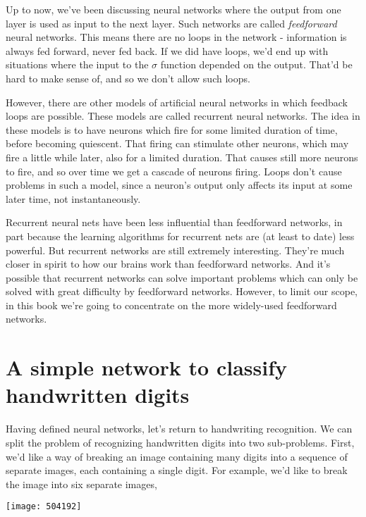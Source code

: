 Up to now, we've been discussing neural networks where the output from one layer is used as input to the next layer. Such networks are called \textit{feedforward} neural networks. This means there are no loops in the network - information is always fed forward, never fed back. If we did have loops, we'd end up with situations where the input to the $\sigma$ function depended on the output. That'd be hard to make sense of, and so we don't allow such loops.

However, there are other models of artificial neural networks in which feedback loops are possible. These models are called recurrent neural networks\cite{WikiPediaRNN2019}. The idea in these models is to have neurons which fire for some limited duration of time, before becoming quiescent. That firing can stimulate other neurons, which may fire a little while later, also for a limited duration. That causes still more neurons to fire, and so over time we get a cascade of neurons firing. Loops don't cause problems in such a model, since a neuron's output only affects its input at some later time, not instantaneously.

Recurrent neural nets have been less influential than feedforward networks, in part because the learning algorithms for recurrent nets are (at least to date) less powerful. But recurrent networks are still extremely interesting. They're much closer in spirit to how our brains work than feedforward networks. And it's possible that recurrent networks can solve important problems which can only be solved with great difficulty by feedforward networks. However, to limit our scope, in this book we're going to concentrate on the more widely-used feedforward networks.

\section{A simple network to classify handwritten digits}

Having defined neural networks, let's return to handwriting recognition. We can split the problem of recognizing handwritten digits into two sub-problems. First, we'd like a way of breaking an image containing many digits into a sequence of separate images, each containing a single digit. For example, we'd like to break the image into six separate images,

\begin{marginfigure}
\texttt{[image: 504192]}
\end{marginfigure}

